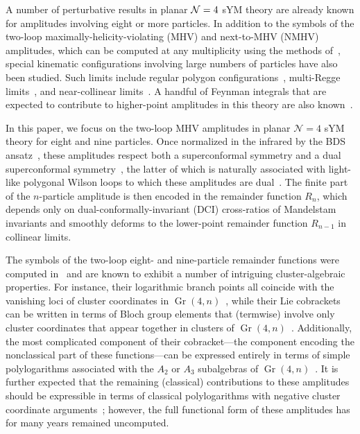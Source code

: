\documentclass[11pt]{article}
\DeclareMathOperator{\Gr}{Gr}
\begin{document}
A number of perturbative results in planar ${\cal N}=4$ sYM theory are already known for amplitudes involving eight or more particles. In addition to the symbols of the two-loop maximally-helicity-violating (MHV) and next-to-MHV (NMHV) amplitudes, which can be computed at any multiplicity using the methods of~\cite{CaronHuot:2011ky,Zhang:2019vnm,He:2020vob}, special kinematic configurations involving large numbers of particles have also been studied. Such limits include regular polygon configurations~\cite{Brandhuber:2009da,DelDuca:2010zp,Heslop:2010kq,Gaiotto:2010fk}, multi-Regge limits~\cite{Bartels:2008ce,Lipatov:2012gk,Bargheer:2015djt,DelDuca:2016lad,DelDuca:2018raq,DelDuca:2019tur}, and near-collinear limits~\cite{Alday:2010ku,Basso:2013vsa,Basso:2013aha,Basso:2014koa,Basso:2014jfa,Basso:2014nra,Belitsky:2014sla,Belitsky:2014lta,Basso:2014hfa,Belitsky:2015efa,Basso:2015rta,Basso:2015uxa,Belitsky:2016vyq}. A handful of Feynman integrals that are expected to contribute to higher-point amplitudes in this theory are also known~\cite{Bourjaily:2018aeq,Henn:2018cdp,He:2020uxy,He:2020lcu,Bourjaily:2021lnz}. 

In this paper, we focus on the two-loop MHV amplitudes in planar $\mathcal{N}=4$ sYM theory for eight and nine particles. Once normalized in the infrared by the BDS ansatz~\cite{Bern:2005iz}, these amplitudes respect both a superconformal symmetry and a dual superconformal symmetry~\cite{Drummond:2007au,Drummond:2006rz,Bern:2006ew,Bern:2007ct,Alday:2007he}, the latter of which is naturally associated with light-like polygonal Wilson loops to which these amplitudes are dual~\cite{Drummond:2007au,Alday:2007hr,Drummond:2007aua,Brandhuber:2007yx,Drummond:2007cf,Bern:2008ap,Drummond:2008aq}. The finite part of the $n$-particle amplitude is then encoded in the remainder function $R_n$, which depends only on dual-conformally-invariant (DCI) cross-ratios of Mandelstam invariants and smoothly deforms to the lower-point remainder function $R_{n{-}1}$ in collinear limits.

The symbols of the two-loop eight- and nine-particle remainder functions were computed in~\cite{CaronHuot:2011ky} and are known to exhibit a number of intriguing cluster-algebraic properties. For instance, their logarithmic branch points all coincide with the vanishing loci of cluster coordinates in $\Gr(4,n)$~\cite{Golden:2013xva}, while their Lie cobrackets can be written in terms of Bloch group elements that (termwise) involve only cluster coordinates that appear together in clusters of $\Gr(4,n)$~\cite{Golden:2014pua}. Additionally, the most complicated component of their cobracket---the component encoding the nonclassical part of these functions---can be expressed entirely in terms of simple polylogarithms associated with the $A_2$ or $A_3$ subalgebras of $\Gr(4,n)$~\cite{Golden:2014xqa}. It is further expected that the remaining (classical) contributions to these amplitudes should be expressible in terms of classical polylogarithms with negative cluster coordinate arguments~\cite{Golden:2014xqf}; however, the full functional form of these amplitudes has for many years remained uncomputed. 
\end{document}
